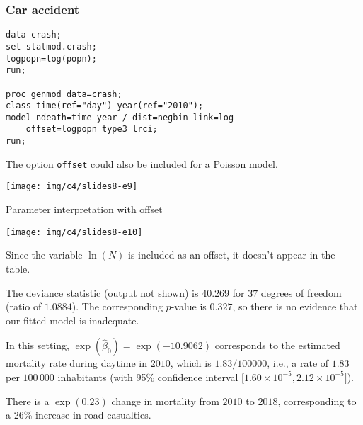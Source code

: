 \documentclass{beamer}
\begin{document}
\begin{frame}[fragile]
\frametitle{Car accident}

\begin{tcolorbox}[colback=white, colframe=hecblue, title=\SASlang{} code to include an offset term]
{\small
\begin{verbatim}
data crash;
set statmod.crash;
logpopn=log(popn);
run;

proc genmod data=crash;
class time(ref="day") year(ref="2010");
model ndeath=time year / dist=negbin link=log 
    offset=logpopn type3 lrci;
run;
\end{verbatim}
}
\end{tcolorbox}
{\footnotesize 

The option \texttt{offset} could also be included for a Poisson model.



}
\begin{center}
 \texttt{[image: img/c4/slides8-e9]}
\end{center}

\end{frame}
\begin{frame}{Parameter interpretation with offset}
\begin{center}
 \texttt{[image: img/c4/slides8-e10]}
\end{center}
{\small 
\bi \item Since the variable $\ln(N)$ is included as an offset, it doesn't appear in the table.
\item The deviance statistic (output not shown) is $40.269$ for $37$ degrees of freedom (ratio of $1.0884$). The corresponding $p$-value is $0.327$, so there is no evidence that our fitted model is inadequate.
\item In this setting, $\exp(\hat{\beta}_0)=\exp(-10.9062)$ corresponds to the estimated mortality rate during daytime in $2010$, which is $1.83/100000$, i.e., a rate of $1.83$ per $100\,000$ inhabitants (with 95\% confidence interval [$1.60  \times 10^{-5}, 2.12 \times 10^{-5}]$).
\item There is a $\exp(0.23)$ change in mortality from $2010$ to $2018$, corresponding to a $26$\% increase in road casualties.
\ei
}
\end{frame}
\end{document}
